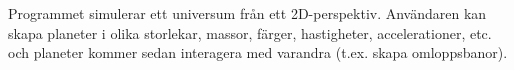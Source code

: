 Programmet simulerar ett universum från ett 2D-perspektiv.
Användaren kan skapa planeter i olika storlekar, massor, färger, hastigheter,
accelerationer, etc.
och planeter kommer sedan interagera med varandra (t.ex. skapa omloppsbanor).

